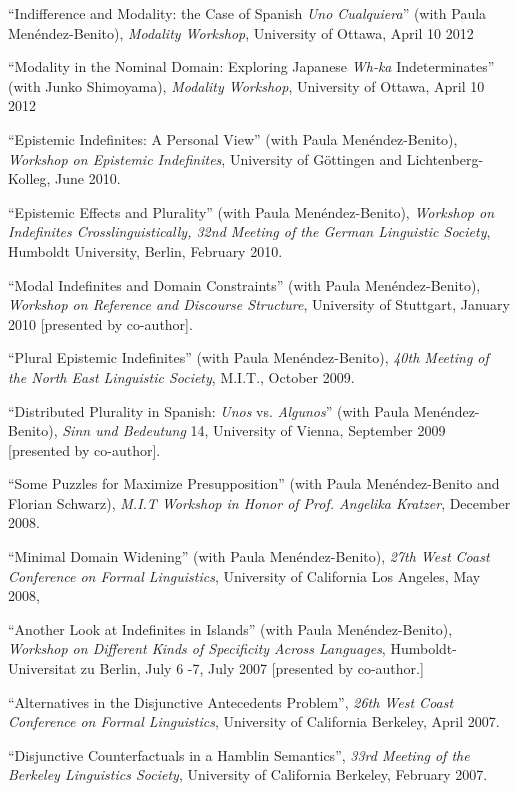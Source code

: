 \documentclass[11pt]{article}
\begin{document}
``Indifference and Modality: the Case of Spanish \textit{Uno
Cualquiera}'' (with Paula
Men\'endez-Benito), \textit{Modality Workshop}, University of Ottawa, April 10 2012

``Modality in the Nominal Domain: Exploring Japanese
\textit{Wh-ka} Indeterminates'' (with Junko Shimoyama), \textit{Modality Workshop}, University of Ottawa, April 10 2012

``Epistemic Indefinites: A Personal View'' (with Paula
Men\'endez-Benito), \textit{Workshop on Epistemic Indefinites},
University of G\"{o}ttingen and Lichtenberg-Kolleg, June 2010.

``Epistemic Effects and Plurality'' (with Paula
Men\'endez-Benito), \textit{Workshop on Indefinites
  Crosslinguistically, 32nd Meeting of the German Linguistic Society},
Humboldt University, Berlin, February 2010.

``Modal Indefinites and Domain Constraints'' (with Paula
Men\'endez-Benito), \textit{Workshop on Reference and Discourse
  Structure}, University of Stuttgart, January 2010 [presented by co-author].

``Plural Epistemic Indefinites'' (with Paula Men\'endez-Benito), \textit{40th
  Meeting of the North East Linguistic Society}, M.I.T., October 2009.

``Distributed Plurality in Spanish: \textit{Unos} vs. \textit{Algunos}''  (with Paula Men\'endez-Benito), \textit{Sinn und Bedeutung} 14, University of Vienna, September 2009 [presented by co-author].

``Some Puzzles for Maximize Presupposition'' (with
  Paula Men\'endez-Benito and Florian Schwarz), \textit{M.I.T Workshop in
  Honor of Prof. Angelika Kratzer}, December 2008.

``Minimal Domain Widening'' (with Paula Men\'endez-Benito), \textit{27th West Coast Conference on
  Formal Linguistics}, University of California Los Angeles, May 2008, 

``Another Look at Indefinites in Islands'' (with Paula
  Men\'endez-Benito), \textit{Workshop on Different Kinds of Specificity
  Across Languages}, Humboldt-Universitat zu Berlin, July 6
  -7, July 2007 [presented by co-author.]

``Alternatives in the Disjunctive Antecedents Problem'', \textit{26th West Coast Conference on Formal Linguistics}, University of California Berkeley, April 2007.


``Disjunctive Counterfactuals in a Hamblin Semantics'', \textit{33rd Meeting of the Berkeley Linguistics Society}, University of California Berkeley, February 2007. 
\end{document}
